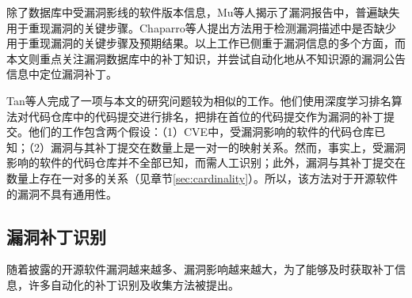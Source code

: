 除了数据库中受漏洞影线的软件版本信息，Mu等人\cite{mu2018understanding}揭示了漏洞报告中，普遍缺失用于重现漏洞的关键步骤。Chaparro等人\cite{chaparro2017detecting}提出方法用于检测漏洞描述中是否缺少用于重现漏洞的关键步骤及预期结果。以上工作已侧重于漏洞信息的多个方面，而本文则重点关注漏洞数据库中的补丁知识，并尝试自动化地从不知识源的漏洞公告信息中定位漏洞补丁。

Tan等人完成了一项与本文的研究问题较为相似的工作\cite{Tan2021locating}。他们使用深度学习排名算法对代码仓库中的代码提交进行排名，把排在首位的代码提交作为漏洞的补丁提交。他们的工作包含两个假设：（1）CVE中，受漏洞影响的软件的代码仓库已知；（2）漏洞与其补丁提交在数量上是一对一的映射关系。然而，事实上，受漏洞影响的软件的代码仓库并不全部已知，而需人工识别；此外，漏洞与其补丁提交在数量上存在一对多的关系（见章节\ref{sec:cardinality}）。所以，该方法对于开源软件的漏洞不具有通用性。




\subsection{漏洞补丁识别}
随着披露的开源软件漏洞越来越多、漏洞影响越来越大，为了能够及时获取补丁信息，许多自动化的补丁识别及收集方法被提出。

